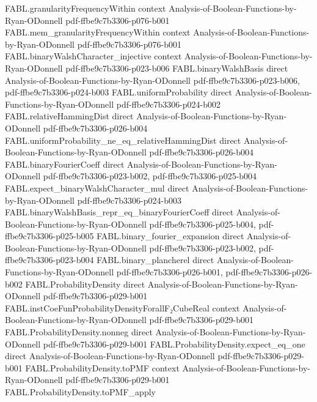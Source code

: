 \begin{theorem}
\proofstep
  {FABL.granularityFrequencyWithin}
  {context}
  {Analysis-of-Boolean-Functions-by-Ryan-ODonnell}
  {pdf-ffbe9c7b3306-p076-b001}
\proofstep
  {FABL.mem_granularityFrequencyWithin}
  {context}
  {Analysis-of-Boolean-Functions-by-Ryan-ODonnell}
  {pdf-ffbe9c7b3306-p076-b001}
\proofstep
  {FABL.binaryWalshCharacter_injective}
  {context}
  {Analysis-of-Boolean-Functions-by-Ryan-ODonnell}
  {pdf-ffbe9c7b3306-p023-b006}
\proofstep
  {FABL.binaryWalshBasis}
  {direct}
  {Analysis-of-Boolean-Functions-by-Ryan-ODonnell}
  {pdf-ffbe9c7b3306-p023-b006,
    pdf-ffbe9c7b3306-p024-b003}
\proofstep
  {FABL.uniformProbability}
  {direct}
  {Analysis-of-Boolean-Functions-by-Ryan-ODonnell}
  {pdf-ffbe9c7b3306-p024-b002}
\proofstep
  {FABL.relativeHammingDist}
  {direct}
  {Analysis-of-Boolean-Functions-by-Ryan-ODonnell}
  {pdf-ffbe9c7b3306-p026-b004}
\proofstep
  {FABL.uniformProbability_ne_eq_relativeHammingDist}
  {direct}
  {Analysis-of-Boolean-Functions-by-Ryan-ODonnell}
  {pdf-ffbe9c7b3306-p026-b004}
\proofstep
  {FABL.binaryFourierCoeff}
  {direct}
  {Analysis-of-Boolean-Functions-by-Ryan-ODonnell}
  {pdf-ffbe9c7b3306-p023-b002,
    pdf-ffbe9c7b3306-p025-b004}
\proofstep
  {FABL.expect_binaryWalshCharacter_mul}
  {direct}
  {Analysis-of-Boolean-Functions-by-Ryan-ODonnell}
  {pdf-ffbe9c7b3306-p024-b003}
\proofstep
  {FABL.binaryWalshBasis_repr_eq_binaryFourierCoeff}
  {direct}
  {Analysis-of-Boolean-Functions-by-Ryan-ODonnell}
  {pdf-ffbe9c7b3306-p025-b004,
    pdf-ffbe9c7b3306-p025-b005}
\proofstep
  {FABL.binary_fourier_expansion}
  {direct}
  {Analysis-of-Boolean-Functions-by-Ryan-ODonnell}
  {pdf-ffbe9c7b3306-p023-b002,
    pdf-ffbe9c7b3306-p023-b004}
\proofstep
  {FABL.binary_plancherel}
  {direct}
  {Analysis-of-Boolean-Functions-by-Ryan-ODonnell}
  {pdf-ffbe9c7b3306-p026-b001,
    pdf-ffbe9c7b3306-p026-b002}
\proofstep
  {FABL.ProbabilityDensity}
  {direct}
  {Analysis-of-Boolean-Functions-by-Ryan-ODonnell}
  {pdf-ffbe9c7b3306-p029-b001}
\proofstep
  {FABL.instCoeFunProbabilityDensityForallF₂CubeReal}
  {context}
  {Analysis-of-Boolean-Functions-by-Ryan-ODonnell}
  {pdf-ffbe9c7b3306-p029-b001}
\proofstep
  {FABL.ProbabilityDensity.nonneg}
  {direct}
  {Analysis-of-Boolean-Functions-by-Ryan-ODonnell}
  {pdf-ffbe9c7b3306-p029-b001}
\proofstep
  {FABL.ProbabilityDensity.expect_eq_one}
  {direct}
  {Analysis-of-Boolean-Functions-by-Ryan-ODonnell}
  {pdf-ffbe9c7b3306-p029-b001}
\proofstep
  {FABL.ProbabilityDensity.toPMF}
  {context}
  {Analysis-of-Boolean-Functions-by-Ryan-ODonnell}
  {pdf-ffbe9c7b3306-p029-b001}
\proofstep
  {FABL.ProbabilityDensity.toPMF_apply}

\end{theorem}
